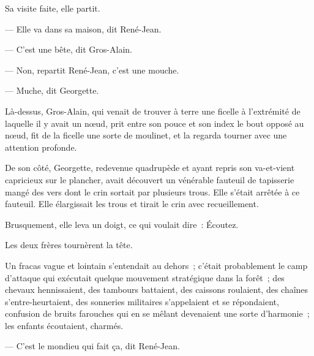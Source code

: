 \documentclass[french,twoside]{book} %
\begin{document}
Sa visite faite, elle partit.\par
— Elle va dans sa maison, dit René-Jean.\par
— C’est une bête, dit Gros-Alain.\par
— Non, repartit René-Jean, c’est une mouche.\par
— Muche, dit Georgette.\par
Là-dessus, Gros-Alain, qui venait de trouver à terre une ficelle à l’extrémité de laquelle il y avait un nœud, prit entre son pouce et son index le bout opposé au nœud, fit de la ficelle une sorte de moulinet, et la regarda tourner avec une attention profonde.\par
De son côté, Georgette, redevenue quadrupède et ayant repris son va-et-vient capricieux sur le plancher, avait découvert un vénérable fauteuil de tapisserie mangé des vers dont le crin sortait par plusieurs trous. Elle s’était arrêtée à ce fauteuil. Elle élargissait les trous et tirait le crin avec recueillement.\par
Brusquement, elle leva un doigt, ce qui voulait dire : Écoutez.\par
Les deux frères tournèrent la tête.\par
Un fracas vague et lointain s’entendait au dehors ; c’était probablement le camp d’attaque qui exécutait quelque mouvement stratégique dans la forêt ; des chevaux hennissaient, des tambours battaient, des caissons roulaient, des chaînes s’entre-heurtaient, des sonneries militaires s’appelaient et se répondaient, confusion de bruits farouches qui en se mêlant devenaient  une sorte d’harmonie ; les enfants écoutaient, charmés.\par
— C’est le mondieu qui fait ça, dit René-Jean.
\end{document}
